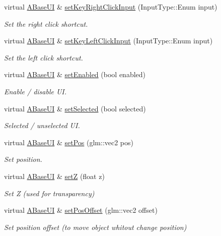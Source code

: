 \begin{DoxyCompactItemize}
virtual \hyperlink{class_a_base_u_i}{A\+Base\+UI} \& \hyperlink{class_a_base_u_i_a28c110e7ad0f77043d5348035bd39f7a}{set\+Key\+Right\+Click\+Input} (Input\+Type\+::\+Enum input)
\begin{DoxyCompactList}\small\item\em Set the right click shortcut. \end{DoxyCompactList}\item 
virtual \hyperlink{class_a_base_u_i}{A\+Base\+UI} \& \hyperlink{class_a_base_u_i_a2a2b600c735d45f2ea2c14291a5292ba}{set\+Key\+Left\+Click\+Input} (Input\+Type\+::\+Enum input)
\begin{DoxyCompactList}\small\item\em Set the left click shortcut. \end{DoxyCompactList}\item 
virtual \hyperlink{class_a_base_u_i}{A\+Base\+UI} \& \hyperlink{class_a_base_u_i_a9b19e675593c03f7d5becbd580bc418b}{set\+Enabled} (bool enabled)
\begin{DoxyCompactList}\small\item\em Enable / disable UI. \end{DoxyCompactList}\item 
virtual \hyperlink{class_a_base_u_i}{A\+Base\+UI} \& \hyperlink{class_a_base_u_i_abe931f9a44c29212a667cdd0f1da6365}{set\+Selected} (bool selected)
\begin{DoxyCompactList}\small\item\em Selected / unselected UI. \end{DoxyCompactList}\item 
virtual \hyperlink{class_a_base_u_i}{A\+Base\+UI} \& \hyperlink{class_a_base_u_i_a68ad426cc75f6a61fe000c8e92d4df0c}{set\+Pos} (glm\+::vec2 pos)
\begin{DoxyCompactList}\small\item\em Set position. \end{DoxyCompactList}\item 
virtual \hyperlink{class_a_base_u_i}{A\+Base\+UI} \& \hyperlink{class_a_base_u_i_a9b7e138cf37199808f55a4596efe4ac9}{setZ} (float z)
\begin{DoxyCompactList}\small\item\em Set Z (used for transparency) \end{DoxyCompactList}\item 
virtual \hyperlink{class_a_base_u_i}{A\+Base\+UI} \& \hyperlink{class_a_base_u_i_a6e209b2a871a2a4afa69f5dff2c6d89e}{set\+Pos\+Offset} (glm\+::vec2 offset)
\begin{DoxyCompactList}\small\item\em Set position offset (to move object whitout change position) \end{DoxyCompactList}\item 

\end{DoxyCompactItemize}
